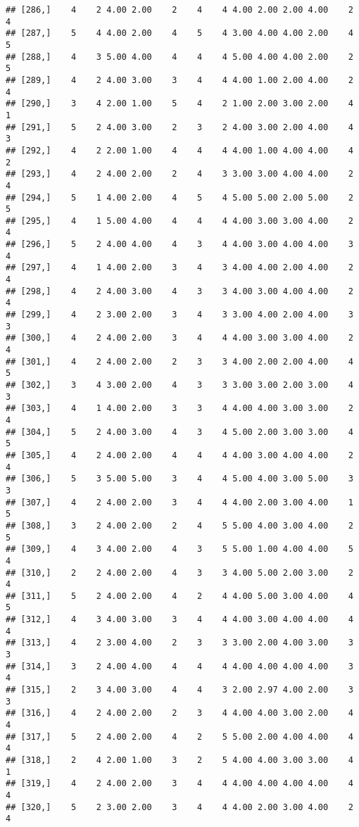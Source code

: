 \documentclass[]{article}
\begin{document}
\begin{verbatim}
## [286,]    4    2 4.00 2.00    2    4    4 4.00 2.00 2.00 4.00    2    4
## [287,]    5    4 4.00 2.00    4    5    4 3.00 4.00 4.00 2.00    4    5
## [288,]    4    3 5.00 4.00    4    4    4 5.00 4.00 4.00 2.00    2    5
## [289,]    4    2 4.00 3.00    3    4    4 4.00 1.00 2.00 4.00    2    4
## [290,]    3    4 2.00 1.00    5    4    2 1.00 2.00 3.00 2.00    4    1
## [291,]    5    2 4.00 3.00    2    3    2 4.00 3.00 2.00 4.00    4    3
## [292,]    4    2 2.00 1.00    4    4    4 4.00 1.00 4.00 4.00    4    2
## [293,]    4    2 4.00 2.00    2    4    3 3.00 3.00 4.00 4.00    2    4
## [294,]    5    1 4.00 2.00    4    5    4 5.00 5.00 2.00 5.00    2    5
## [295,]    4    1 5.00 4.00    4    4    4 4.00 3.00 3.00 4.00    2    4
## [296,]    5    2 4.00 4.00    4    3    4 4.00 3.00 4.00 4.00    3    4
## [297,]    4    1 4.00 2.00    3    4    3 4.00 4.00 2.00 4.00    2    4
## [298,]    4    2 4.00 3.00    4    3    3 4.00 3.00 4.00 4.00    2    4
## [299,]    4    2 3.00 2.00    3    4    3 3.00 4.00 2.00 4.00    3    3
## [300,]    4    2 4.00 2.00    3    4    4 4.00 3.00 3.00 4.00    2    4
## [301,]    4    2 4.00 2.00    2    3    3 4.00 2.00 2.00 4.00    4    5
## [302,]    3    4 3.00 2.00    4    3    3 3.00 3.00 2.00 3.00    4    3
## [303,]    4    1 4.00 2.00    3    3    4 4.00 4.00 3.00 3.00    2    4
## [304,]    5    2 4.00 3.00    4    3    4 5.00 2.00 3.00 3.00    4    5
## [305,]    4    2 4.00 2.00    4    4    4 4.00 3.00 4.00 4.00    2    4
## [306,]    5    3 5.00 5.00    3    4    4 5.00 4.00 3.00 5.00    3    3
## [307,]    4    2 4.00 2.00    3    4    4 4.00 2.00 3.00 4.00    1    5
## [308,]    3    2 4.00 2.00    2    4    5 5.00 4.00 3.00 4.00    2    5
## [309,]    4    3 4.00 2.00    4    3    5 5.00 1.00 4.00 4.00    5    4
## [310,]    2    2 4.00 2.00    4    3    3 4.00 5.00 2.00 3.00    2    4
## [311,]    5    2 4.00 2.00    4    2    4 4.00 5.00 3.00 4.00    4    5
## [312,]    4    3 4.00 3.00    3    4    4 4.00 3.00 4.00 4.00    4    4
## [313,]    4    2 3.00 4.00    2    3    3 3.00 2.00 4.00 3.00    3    3
## [314,]    3    2 4.00 4.00    4    4    4 4.00 4.00 4.00 4.00    3    4
## [315,]    2    3 4.00 3.00    4    4    3 2.00 2.97 4.00 2.00    3    3
## [316,]    4    2 4.00 2.00    2    3    4 4.00 4.00 3.00 2.00    4    4
## [317,]    5    2 4.00 2.00    4    2    5 5.00 2.00 4.00 4.00    4    4
## [318,]    2    4 2.00 1.00    3    2    5 4.00 4.00 3.00 3.00    4    1
## [319,]    4    2 4.00 2.00    3    4    4 4.00 4.00 4.00 4.00    4    4
## [320,]    5    2 3.00 2.00    3    4    4 4.00 2.00 3.00 4.00    2    4

\end{verbatim}
\end{document}
